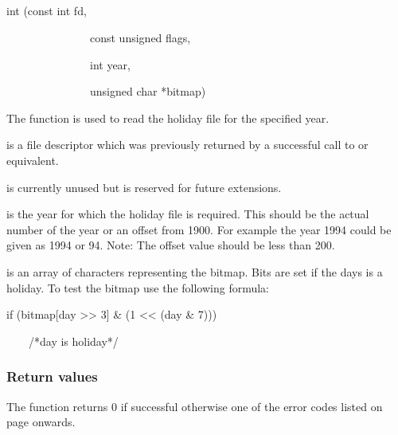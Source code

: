 \subsection{\funcnameXBholread{}}

\begin{expara}

int \funcnameXBholread{}(const int fd,

\ \ \ \ \ \ \ \ \ \ \ \ \ \ \ const unsigned flags,

\ \ \ \ \ \ \ \ \ \ \ \ \ \ \ int year,

\ \ \ \ \ \ \ \ \ \ \ \ \ \ \ unsigned char *bitmap)

\end{expara}

The function \funcXBholread{} is used to read the holiday file for the specified year.

 is a file descriptor which was previously returned by a successful call to \funcXBopen{} or equivalent.

 is currently unused but is reserved for future extensions.

 is the year for which the holiday file is
required. This should be the actual number of the year or an offset
from 1900. For example the year 1994 could be given as 1994 or 94.
Note: The offset value should be less than 200.

 is an array of characters representing the bitmap. Bits are set if the days is a holiday. To test the bitmap use
the following formula:

\begin{expara}

if (bitmap[day {\textgreater}{\textgreater} 3] \& (1
{\textless}{\textless} (day \& 7)))

\ \ \ \ /*day is holiday*/

\end{expara}

\subsubsection{Return values}
The function returns 0 if successful otherwise one of the error codes
listed on page \pageref{errorcodes} onwards.

